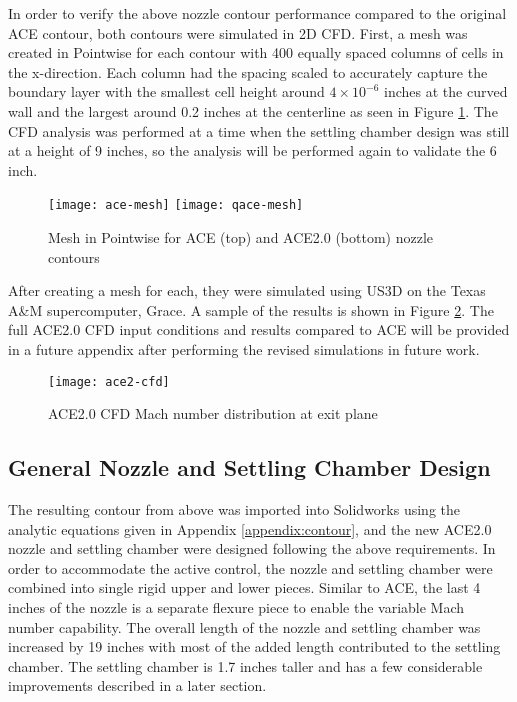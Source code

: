 In order to verify the above nozzle contour performance compared to the original ACE contour, both contours were simulated in 2D CFD. First, a mesh was created in Pointwise for each contour with 400 equally spaced columns of cells in the x-direction. Each column had the spacing scaled to accurately capture the boundary layer with the smallest cell height around $4 \times 10^{-6}$ inches at the curved wall and the largest around 0.2 inches at the centerline as seen in Figure \ref{fig:mesh}. The CFD analysis was performed at a time when the settling chamber design was still at a height of 9 inches, so the analysis will be performed again to validate the 6 inch.

\begin{figure}[ht!]
    \centering
    \texttt{[image: ace-mesh]}
    \texttt{[image: qace-mesh]}
    \caption{Mesh in Pointwise for ACE (top) and ACE2.0 (bottom) nozzle contours}
    \label{fig:mesh}
\end{figure}

After creating a mesh for each, they were simulated using US3D on the Texas A\&M supercomputer, Grace. A sample of the results is shown in Figure \ref{fig:ace2-cfd}. The full ACE2.0 CFD input conditions and results compared to ACE will be provided in a future appendix after performing the revised simulations in future work.


\begin{figure}[ht!]
    \centering
    \texttt{[image: ace2-cfd]}
    \caption{ACE2.0 CFD Mach number distribution at exit plane}
    \label{fig:ace2-cfd}
\end{figure}

\subsection{General Nozzle and Settling Chamber Design}

The resulting contour from above was imported into Solidworks using the analytic equations given in Appendix \ref{appendix:contour}, and the new ACE2.0 nozzle and settling chamber were designed following the above requirements. In order to accommodate the active control, the nozzle and settling chamber were combined into single rigid upper and lower pieces. Similar to ACE, the last 4 inches of the nozzle is a separate flexure piece to enable the variable Mach number capability. The overall length of the nozzle and settling chamber was increased by 19 inches with most of the added length contributed to the settling chamber. The settling chamber is 1.7 inches taller and has a few considerable improvements described in a later section. 

